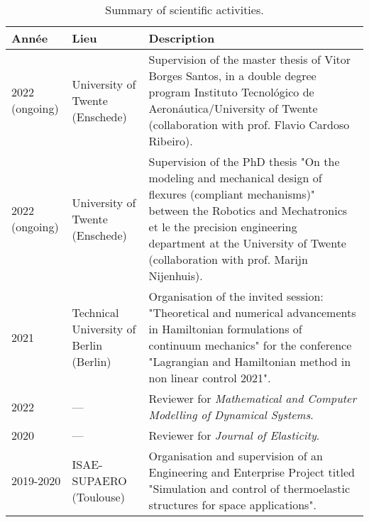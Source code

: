 \documentclass[12pt]{article}
\begin{document}
	\begin{table}[h]
		\centering
		\begin{tabular}{p{}p{}p{}}
			\hline
			Année & Lieu & Description  \\
			\hline
			2022 (ongoing) & University of Twente (Enschede) & Supervision of the master thesis of Vitor Borges Santos, in a double degree program  Instituto Tecnológico de Aeronáutica/University of Twente (collaboration with prof. Flavio Cardoso Ribeiro). \\
			2022 (ongoing) & University of Twente (Enschede) & Supervision of the PhD thesis "On the modeling and mechanical design of flexures (compliant mechanisms)" between the Robotics and Mechatronics et le the precision engineering department at the University of Twente (collaboration with prof. Marijn Nijenhuis). \\
			\hline
			2021  & Technical University of Berlin (Berlin) & Organisation of the invited session: "Theoretical and numerical advancements in Hamiltonian formulations of continuum mechanics" for the conference "Lagrangian and Hamiltonian method in non linear control 2021". \\
			\hline
			2022 & --- & Reviewer for \textit{Mathematical and Computer Modelling of Dynamical Systems}. \\
			2020 & --- & Reviewer for \textit{Journal of Elasticity}. \\
			\hline
			2019-2020 & ISAE-SUPAERO (Toulouse) & Organisation and supervision of an Engineering and Enterprise Project titled  "Simulation and control of thermoelastic structures for space applications". \\
			\hline
		\end{tabular}
		\caption{Summary of scientific activities.}
		\label{tab:activites}
	\end{table}
	
\end{document}
